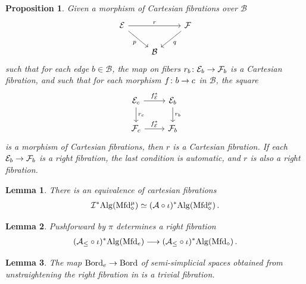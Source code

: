 \documentclass[10pt,a4paper]{amsart}
\newtheorem{prop}{Proposition}
\newtheorem{lem}{Lemma}
\newcommand{\Alg}{\mathrm{Alg}\vphantom{z}}
\newcommand{\Mfd}{\mathrm{Mfd}\vphantom{d}}
\newcommand{\PreBord}{\mathrm{Bord}\vphantom{d}}
\newcommand{\cA}{\mathcal{A}}
\newcommand{\cB}{\mathcal{B}}
\newcommand{\cE}{\mathcal{E}}
\newcommand{\cF}{\mathcal{F}}
\newcommand{\cI}{\mathcal{I}}
\renewcommand{\to}{\mathchoice{\longrightarrow}{\rightarrow}{}{}}
\begin{document}
	\begin{prop}\label{thm:iterated_fibration}
		Given a morphism of Cartesian fibrations over $\cB$
		\begin{equation*}
			\begin{tikzcd}
				\cE \arrow[rr, "r"] \arrow[dr, "p"'] & & \cF \arrow[dl, "q"] \\
				& \cB &
			\end{tikzcd}
		\end{equation*}
		such that for each edge $b\in \cB$, the map on fibers $r_{b}\colon \cE_{b} \to \cF_{b}$ is a Cartesian fibration, and such that for each morphism $f\colon b\to c$ in $\cB$, the square
		\begin{equation*}
			\begin{tikzcd}
				\cE_{c} \arrow[r, "f^{*}_{\cE}"] \arrow[d, "r_{c}"]      &   \cE_{b}  \arrow[d, "r_{b}"] \\
				\cF_{c}  \arrow[r, "f^{*}_{\cE}"]               &   \cF_{b}
			\end{tikzcd}
		\end{equation*}
		is a morphism of Cartesian fibrations, then $r$ is a Cartesian fibration.
    If each $\cE_{b}\to \cF_{b}$ is a right fibration, the last condition is automatic, and $r$ is also a right fibration.
	\end{prop}

\begin{lem}\label{lem:A=I}
	There is an equivalence of cartesian fibrations
	\begin{align*}
		\cI^{*}\Alg(\Mfd_{\diamond}^{\mu}) \simeq (\cA\circ \iota)^{*}\Alg(\Mfd_{\diamond}^{\mu}) \,.
	\end{align*}
\end{lem}

\begin{lem}\label{lem:Mfd_e->Mfd_is_right_fib}
	Pushforward by $\pi$ determines a right fibration
	\begin{align*}
		(\cA_{\leq}\circ \iota)^{*}\Alg(\Mfd_{e}) \to (\cA_{\leq}\circ \iota)^{*}\Alg(\Mfd_{\diamond})\,.
	\end{align*}
\end{lem}

\begin{lem}\label{lem:Bord_e->Bord_is_trivial}
	The map $\PreBord_{e} \to \PreBord$ of semi-simplicial spaces obtained from unstraightening the right fibration in  is a trivial fibration.
\end{lem}
\end{document}
